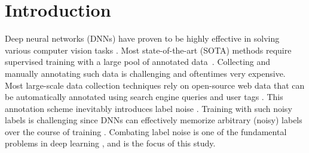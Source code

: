\documentclass[10pt,twocolumn,letterpaper]{article}
\begin{document}
\vspace{-2mm}
\section{Introduction}
\label{sec:intro}
\vspace{-2mm} 












Deep neural networks (DNNs) have proven to be highly effective in solving various computer vision tasks \cite{krizhevsky2012imagenet,noh2015learning, diaz2009integration,redmon2016look, yao2021non, joseph2021towards,wang2021contrastive, song2021addersr, srinivas2021bottleneck}. Most state-of-the-art (SOTA) methods require supervised training with a large pool of annotated data~\cite{deng2009imagenet,xiao2015learning, li2017webvision, lin2014microsoft, bossard2014food}. Collecting and manually annotating such data is challenging and oftentimes very expensive. Most large-scale data collection techniques rely on open-source web data that can be automatically annotated using search engine queries and user tags \cite{makadia2008new,tsai2008automatically}. This annotation scheme inevitably introduces label noise \cite{xiao2015learning, li2017webvision}. Training with such noisy labels is challenging since DNNs can effectively memorize arbitrary (noisy) labels over the course of training \cite{arpit2017closer}. Combating label noise is one of the fundamental problems in deep learning \cite{xie2020self,wang2019co,wang2019co, hu2019noise,shen2020noise,li2020learning, xue2019robust, yang2021joint, yu2021divergence,oh2021background}, and is the focus of this study.    
\end{document}
